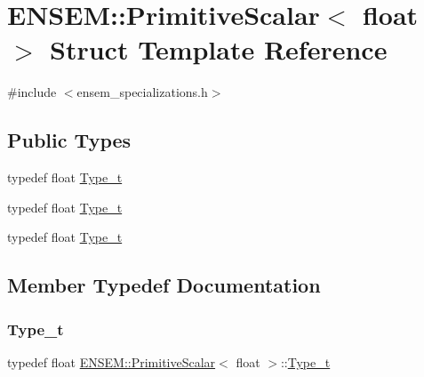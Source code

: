 \hypertarget{structENSEM_1_1PrimitiveScalar_3_01float_01_4}{}\section{E\+N\+S\+EM\+:\+:Primitive\+Scalar$<$ float $>$ Struct Template Reference}
\label{structENSEM_1_1PrimitiveScalar_3_01float_01_4}


{\ttfamily \#include $<$ensem\+\_\+specializations.\+h$>$}

\subsection*{Public Types}
\begin{DoxyCompactItemize}
\item 
typedef float \mbox{\hyperlink{structENSEM_1_1PrimitiveScalar_3_01float_01_4_a227fd22d14a3854ff0e0afbf40a04433}{Type\+\_\+t}}
\item 
typedef float \mbox{\hyperlink{structENSEM_1_1PrimitiveScalar_3_01float_01_4_a227fd22d14a3854ff0e0afbf40a04433}{Type\+\_\+t}}
\item 
typedef float \mbox{\hyperlink{structENSEM_1_1PrimitiveScalar_3_01float_01_4_a227fd22d14a3854ff0e0afbf40a04433}{Type\+\_\+t}}
\end{DoxyCompactItemize}


\subsection{Member Typedef Documentation}
\mbox{\label{structENSEM_1_1PrimitiveScalar_3_01float_01_4_a227fd22d14a3854ff0e0afbf40a04433}} 
\subsubsection{\texorpdfstring{Type\_t}{Type\_t}\hspace{0.1cm}{\footnotesize\ttfamily [1/3]}}
{\footnotesize\ttfamily typedef float \mbox{\hyperlink{structENSEM_1_1PrimitiveScalar}{E\+N\+S\+E\+M\+::\+Primitive\+Scalar}}$<$ float $>$\+::\mbox{\hyperlink{structENSEM_1_1PrimitiveScalar_3_01float_01_4_a227fd22d14a3854ff0e0afbf40a04433}{Type\+\_\+t}}}

